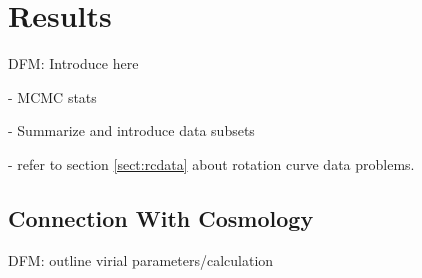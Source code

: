 \documentclass[preprint]{aastex}
\newcommand{\eqlabel}[1]{\label{eq:#1}}
\newcommand{\eq}[1]{equation \ref{eq:#1}}
\begin{document}

\section{Results}

DFM: Introduce here

- MCMC stats

- Summarize and introduce data subsets

- refer to section \ref{sect:rcdata} about rotation curve data problems.


\subsection{Connection With Cosmology}

DFM: outline virial parameters/calculation
\end{document}
